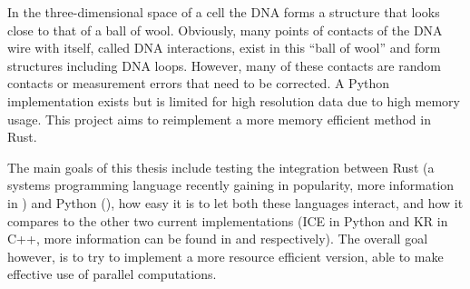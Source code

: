 

In the three-dimensional space of a cell the DNA forms a structure that looks
close to that of a ball of wool. Obviously, many points of contacts of the DNA
wire with itself, called DNA interactions, exist in this ``ball of wool'' and
form structures including DNA loops. However, many of these contacts are
random contacts or measurement errors that need to be corrected. A Python
implementation exists but is limited for high resolution data due to high
memory usage. This project aims to reimplement a more memory efficient
method in Rust.

The main goals of this thesis include testing the integration between Rust (a
systems programming language recently gaining in popularity, more information
in ) and Python (), how easy it is to
let both these languages interact, and how it compares to the other two current
implementations (ICE in Python and KR in C++, more information can be found in
 and  respectively). The overall goal
however, is to try to implement a more resource efficient version, able to make
effective use of parallel computations.


